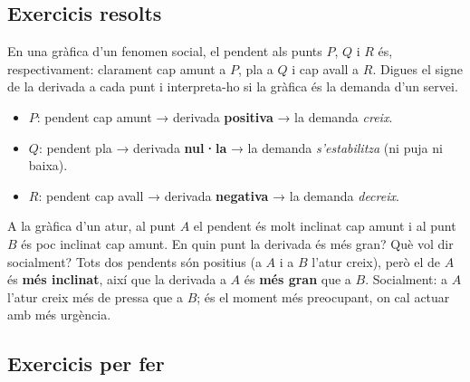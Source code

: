 \subsection{Exercicis resolts}

\begin{exresolt}
En una gràfica d'un fenomen social, el pendent als punts $P$, $Q$ i $R$ és,
respectivament: clarament cap amunt a $P$, pla a $Q$ i cap avall a $R$. Digues el
signe de la derivada a cada punt i interpreta-ho si la gràfica és la demanda d'un
servei.
\solucio
\begin{itemize}[leftmargin=1.4em, itemsep=2pt]
  \item $P$: pendent cap amunt → derivada \textbf{positiva} → la demanda \emph{creix}.
  \item $Q$: pendent pla → derivada \textbf{nul·la} → la demanda \emph{s'estabilitza}
        (ni puja ni baixa).
  \item $R$: pendent cap avall → derivada \textbf{negativa} → la demanda \emph{decreix}.
\end{itemize}
\end{exresolt}

\begin{exresolt}
A la gràfica d'un atur, al punt $A$ el pendent és molt inclinat cap amunt i al punt $B$
és poc inclinat cap amunt. En quin punt la derivada és més gran? Què vol dir
socialment?
\solucio
Tots dos pendents són positius (a $A$ i a $B$ l'atur creix), però el de $A$ és
\textbf{més inclinat}, així que la derivada a $A$ és \textbf{més gran} que a $B$.
Socialment: a $A$ l'atur creix més de pressa que a $B$; és el moment més preocupant,
on cal actuar amb més urgència.
\end{exresolt}

\subsection{Exercicis per fer}

